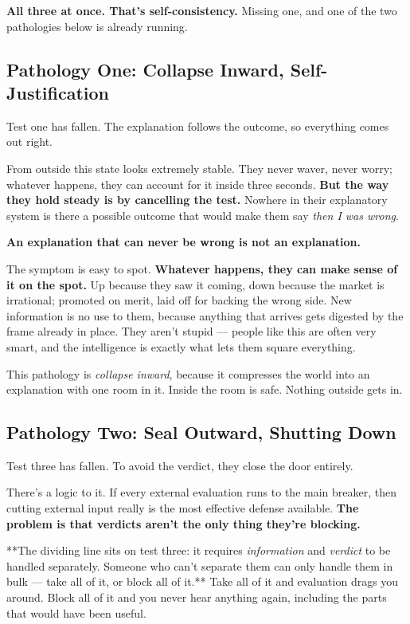 \documentclass[11pt,a4paper]{article}
\begin{document}
\textbf{All three at once. That's self-consistency.} Missing one, and one of the two pathologies below is already running.

\subsection{Pathology One: Collapse Inward, Self-Justification}

Test one has fallen. The explanation follows the outcome, so everything comes out right.

From outside this state looks extremely stable. They never waver, never worry; whatever happens, they can account for it inside three seconds. \textbf{But the way they hold steady is by cancelling the test.} Nowhere in their explanatory system is there a possible outcome that would make them say \textit{then I was wrong}.

\textbf{An explanation that can never be wrong is not an explanation.}

The symptom is easy to spot. \textbf{Whatever happens, they can make sense of it on the spot.} Up because they saw it coming, down because the market is irrational; promoted on merit, laid off for backing the wrong side. New information is no use to them, because anything that arrives gets digested by the frame already in place. They aren't stupid --- people like this are often very smart, and the intelligence is exactly what lets them square everything.

This pathology is \textit{collapse inward}, because it compresses the world into an explanation with one room in it. Inside the room is safe. Nothing outside gets in.

\subsection{Pathology Two: Seal Outward, Shutting Down}

Test three has fallen. To avoid the verdict, they close the door entirely.

There's a logic to it. If every external evaluation runs to the main breaker, then cutting external input really is the most effective defense available. \textbf{The problem is that verdicts aren't the only thing they're blocking.}

**The dividing line sits on test three: it requires \textit{information} and \textit{verdict} to be handled separately. Someone who can't separate them can only handle them in bulk --- take all of it, or block all of it.** Take all of it and evaluation drags you around. Block all of it and you never hear anything again, including the parts that would have been useful.
\end{document}
